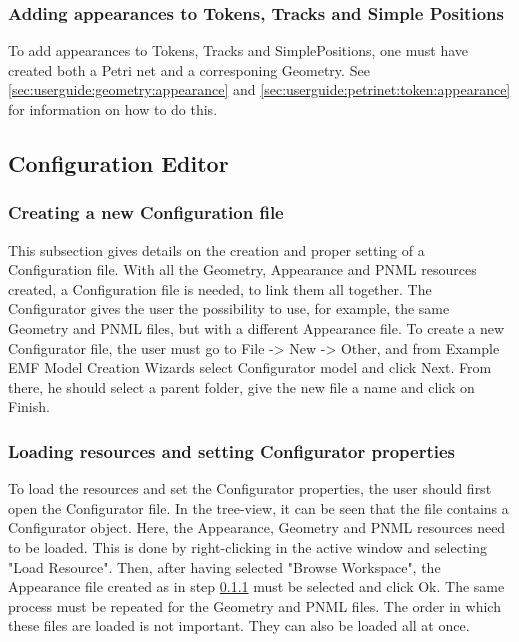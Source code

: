 \subsubsection{Adding appearances to Tokens, Tracks and Simple Positions}
To add appearances to Tokens, Tracks and SimplePositions, one must have created both a Petri net and a corresponing Geometry. See \ref{sec:userguide:geometry:appearance} and \ref{sec:userguide:petrinet:token:appearance} for information on how to do this.

\subsection{Configuration Editor}
\label{sec:userguide:configuration}

\subsubsection{Creating a new Configuration file}
\label{sec:userguide:configuration:new}
This subsection gives details on the creation and proper setting of a Configuration file.
With all the Geometry, Appearance and PNML resources created, a Configuration file is needed, to link them all together. The Configurator gives the user the possibility to use, for example, the same Geometry and PNML files, but with a different Appearance file.
To create a new Configurator file, the user must go to File -> New -> Other, and from Example EMF Model Creation Wizards select Configurator model and click Next. From there, he should select a parent folder, give the new file a name and click on Finish. 

\subsubsection{Loading resources and setting Configurator properties}
To load the resources and set the Configurator properties, the user should first open the Configurator file. In the tree-view, it can be seen that the file contains a Configurator object. Here, the Appearance, Geometry and PNML resources need to be loaded. This is done by right-clicking in the active window and selecting "Load Resource". Then, after having selected "Browse Workspace", the Appearance file created as in step \ref{sec:userguide:configuration:new} must be selected and click Ok. The same process must be repeated for the Geometry and PNML files. The order in which these files are loaded is not important. They can also be loaded all at once. 

